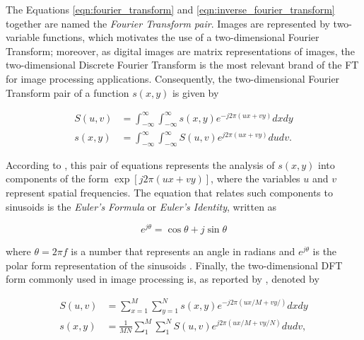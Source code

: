 The Equations \ref{eqn:fourier_transform} and \ref{eqn:inverse_fourier_transform} together are named the \emph{Fourier Transform pair}. Images are represented by two-variable functions, which motivates the use of a two-dimensional Fourier Transform; moreover, as digital images are matrix representations of images, the two-dimensional Discrete Fourier Transform is the most relevant brand of the FT for image processing applications. Consequently, the two-dimensional Fourier Transform pair of a function $s(x,y)$ is given by

\begin{align}
\label{eqn:two_dimensional_continuous_fourier_transform}
S(u,v) &= \int_{-\infty}^{\infty}
         \int_{-\infty}^{\infty}
         s(x,y) e^{-j 2 \pi 
                    \left(
                        ux + vy
                    \right)
                  }
        dx dy\\
s(x,y) &= \int_{-\infty}^{\infty}
         \int_{-\infty}^{\infty}
         S(u,v) e^{j 2 \pi 
                    \left(
                        ux + vy
                    \right)
                  }
        du dv.
\end{align}

According to , this pair of equations represents the analysis of $s(x,y)$ into components of the form $\exp{\left[j 2 \pi (ux + vy) \right]}$, where the variables $u$ and $v$ represent spatial frequencies. The equation that relates such components to sinusoids is the \emph{Euler's Formula} or \emph{Euler's Identity}, written as

\begin{equation}
\label{eqn:euler_formula}
    e^{j\theta} = \cos{\theta} + j\sin{\theta}
\end{equation}

\noindent where $\theta = 2 \pi f$ is a number that represents an angle in radians and $e^{j\theta}$ is the polar form representation of the sinusoids \cite{gonzalez2018digital}. Finally, the two-dimensional DFT form commonly used in image processing is, as reported by , denoted by

\begin{align}
\label{eqn:two_dimensional_discrete_fourier_transform}
S(u,v) &= \sum_{x = 1}^{M}
          \sum_{y = 1}^{N}
          s(x,y) e^{-j 2 \pi 
                    \left(
                        ux/M + vy/
                    \right)
                  }
        dx dy\\
s(x,y) &= \frac{1}{MN}
          \sum_{1}^{M}
          \sum_{1}^{N}
          S(u,v) e^{j 2 \pi 
                    \left(
                        ux/M + vy/N
                    \right)
                  }
        du dv,
\end{align}

